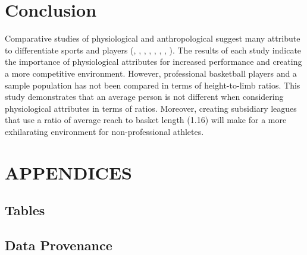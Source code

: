 \documentclass[]{article}
\begin{document}
\section{Conclusion}
\label{sec:conclusion}

Comparative studies of physiological and anthropological suggest many
attribute to differentiate sports and players (\citep{vaquera:2015},
\citep{masanovic:2018}, \citep{korkmaz:2020}, \citep{drinkwater:2008},
\citep{strumbelj:2014}, \citep{ljubojevic:2020}, \citep{gryko:2018},
\citep{bayios:2006}). The results of each study indicate the importance
of physiological attributes for increased performance and creating a
more competitive environment. However, professional basketball players
and a sample population has not been compared in terms of height-to-limb
ratios. This study demonstrates that an average person is not different
when considering physiological attributes in terms of ratios. Moreover,
creating subsidiary leagues that use a ratio of average reach to basket
length (1.16) will make for a more exhilarating environment for
non-professional athletes.

\newpage

\section{APPENDICES}
\label{sec:appendix}

\subsection{Tables}
\label{sec:appendix-table}



\newpage
\subsection{Data Provenance}
\label{sec:appendix-data-provenance}
\end{document}
